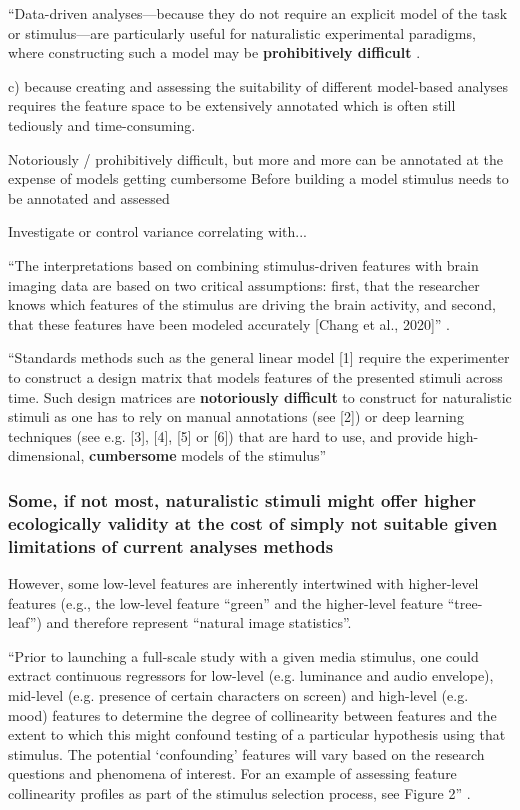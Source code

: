 ``Data-driven analyses---because they do not require an explicit model of the
task or stimulus---are particularly useful for naturalistic experimental
paradigms, where constructing such a model may be \textbf{prohibitively
difficult} \citep{nastase2019measuring}.


%
c) because creating and assessing the suitability of different model-based
analyses requires the feature space to be extensively annotated which is often
still tediously and time-consuming.

%
Notoriously / prohibitively difficult, but more and more can be annotated at the
expense of models getting cumbersome
%
Before building a model stimulus needs to be annotated and assessed


Investigate or control variance correlating with...

%
``The interpretations based on combining stimulus-driven features with brain
imaging data are based on two critical assumptions:
%
first, that the researcher knows which features of the stimulus are driving the
brain activity, and second, that these features have been modeled accurately
[Chang et al., 2020]'' \citep{saarimaki2021naturalistic}.

%
``Standards methods such as the general linear model [1] require the
experimenter to construct a design matrix that models features of the presented
stimuli across time.
%
Such design matrices are \textbf{notoriously difficult} to construct for
naturalistic stimuli as one has to rely on manual annotations (see [2]) or deep
learning techniques (see e.g. [3], [4], [5] or [6]) that are hard to use, and
provide high-dimensional, \textbf{cumbersome} models of the stimulus''
\citep{richard2019fast} \citep[cf., e.g.,][]{deniz2019representation}



\subsubsection{Some, if not most, naturalistic stimuli might offer higher
ecologically validity at the cost of simply not suitable given limitations of
current analyses methods}

%
However, some low-level features are inherently intertwined with higher-level
features (e.g., the low-level feature ``green'' and the higher-level feature
``tree-leaf'') and therefore represent ``natural image statistics''.


``Prior to launching a full-scale study with a given media stimulus, one could
extract continuous regressors for low-level (e.g. luminance and audio
envelope), mid-level (e.g. presence of certain characters on screen) and
high-level (e.g. mood) features to determine the degree of collinearity between
features and the extent to which this might confound testing of a particular
hypothesis using that stimulus.
%
The potential ‘confounding’ features will vary based on the research questions
and phenomena of interest. For an example of assessing feature collinearity
profiles as part of the stimulus selection process, see Figure 2''
\citep{grall2022leveraging}.

